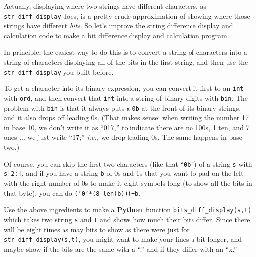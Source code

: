 \documentclass[12pt,letterpaper]{amsbook}
\theoremstyle{definition}
\theoremstyle{remark}
\numberwithin{figure}{section}
\numberwithin{exercise}{chapter}
\numberwithin{section}{chapter}
\numberwithin{equation}{section}
\numberwithin{table}{subsection}
\newcommand{\code}[1]{\colorbox{lg}{\texttt{#1}}}
\newcommand{\Python}{{\textbf{\ix{Python}}}}
\newcommand{\ix}[1]{{#1}\index{#1}}
\begin{document}
\begin{CTtcb}[label=ct:bit_difference_checker]{}{}
 Actually, displaying where two strings have different characters, as
 \code{str\_diff\_display} does, is a pretty crude approximation of showing
 where those strings have different \emph{bits}.  So let's improve the string
 difference display and calculation code to make a bit difference display and
 calculation program.

 In principle, the easiest way to do this is to convert a string of characters
 into a string of characters displaying all of the bits in the first string,
 and then use the \code{str\_diff\_display} you built before.

 To get a character into its binary expression, you can convert it first to
 an \code{int} with \code{ord}, and then convert that \code{int} into a string
 of binary digits with \code{bin}.  The problem with \code{bin} is that it
 always puts a \code{0b} at the front of its binary strings, and it also
 drops off leading 0s.  (That makes sense: when writing the number 17 in base
 10, we don't write it as ``017,'' to indicate there are no 100s, 1 ten, and 7
 ones ... we just write ``17;'' \textit{i.e.,} we drop leading 0s.  The same
 happens in base two.)

 Of course, you can skip the first two characters (like that ``\code{0b}'') of
 a string \code{s} with \code{s[2:]}, and if you have a string \code{b} of 0s
 and 1s that you want to pad on the left with the right number of 0s to make
 it eight symbols long (to show all the bits in that byte), you can
 do \code{('0'*(8-len(b)))+b}.

 Use the above ingredients to make a \Python\ function
 \code{bits\_diff\_display(s,t)} which takes two string \code{s} and \code{t}
 and shows how much their bits differ.  Since there will be eight times as
 may bits to show as there were just for \code{str\_diff\_display(s,t)}, you
 might want to make your lines a bit longer, and maybe show if the bits are
 the same with a ``.'' and if they differ with an ``x.''


\end{CTtcb}
\end{document}
